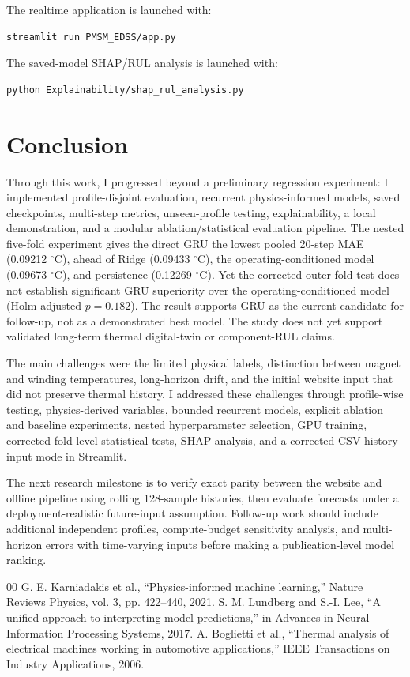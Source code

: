 \documentclass[conference]{IEEEtran}
\begin{document}
The realtime application is launched with:
\begin{verbatim}
streamlit run PMSM_EDSS/app.py
\end{verbatim}
The saved-model SHAP/RUL analysis is launched with:
\begin{verbatim}
python Explainability/shap_rul_analysis.py
\end{verbatim}

\section{Conclusion}
Through this work, I progressed beyond a preliminary regression experiment: I
implemented profile-disjoint evaluation, recurrent physics-informed models,
saved checkpoints, multi-step metrics, unseen-profile testing, explainability,
a local demonstration, and a modular ablation/statistical evaluation pipeline.
The nested five-fold experiment gives the direct GRU the lowest pooled
20-step MAE (0.09212 $^{\circ}$C), ahead of Ridge (0.09433 $^{\circ}$C), the
operating-conditioned model (0.09673 $^{\circ}$C), and persistence (0.12269
$^{\circ}$C). Yet the corrected outer-fold test does not establish significant
GRU superiority over the operating-conditioned model (Holm-adjusted
$p=0.182$). The result supports GRU as the current candidate for follow-up,
not as a demonstrated best model. The study does not yet
support validated long-term thermal digital-twin or component-RUL claims.

The main challenges were the limited physical labels, distinction between
magnet and winding temperatures, long-horizon drift, and the initial website
input that did not preserve thermal history. I addressed these challenges
through profile-wise testing, physics-derived variables, bounded recurrent
models, explicit ablation and baseline experiments, nested hyperparameter
selection, GPU training, corrected fold-level statistical tests, SHAP
analysis, and a corrected CSV-history input mode in Streamlit.

The next research milestone is to verify exact parity between the website and
offline pipeline using rolling 128-sample histories, then evaluate forecasts
under a deployment-realistic future-input assumption. Follow-up work should
include additional independent profiles, compute-budget sensitivity analysis,
and multi-horizon errors with time-varying inputs before making a
publication-level model ranking.

\begin{thebibliography}{00}
 G. E. Karniadakis et al., ``Physics-informed machine learning,''
Nature Reviews Physics, vol. 3, pp. 422--440, 2021.
 S. M. Lundberg and S.-I. Lee, ``A unified approach to interpreting
model predictions,'' in Advances in Neural Information Processing Systems, 2017.
 A. Boglietti et al., ``Thermal analysis of electrical machines
working in automotive applications,'' IEEE Transactions on Industry
Applications, 2006.
\end{thebibliography}
\end{document}

